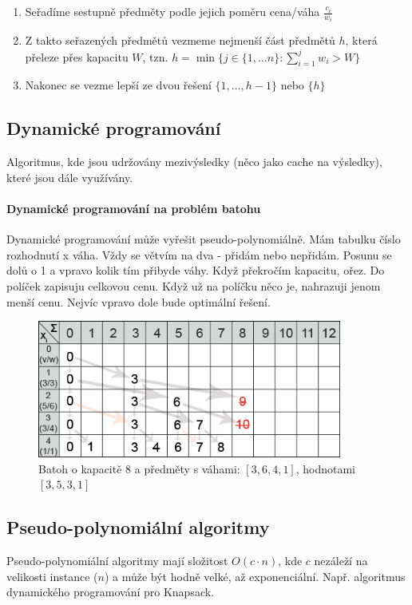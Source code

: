 \begin{enumerate}
\item Seřadíme sestupně předměty podle jejich poměru cena/váha $\frac{c_i}{w_i}$
\item Z takto seřazených předmětů vezmeme nejmenší část předmětů $h$, která přeleze přes kapacitu $W$, tzn. $h = \min\{j \in \{1,\hdots n\} : \sum\limits^{j}_{i = 1} w_i > W\}$
\item Nakonec se vezme lepší ze dvou řešení $\{1,\hdots, h-1\}$ nebo $\{h\}$
\end{enumerate}

\subsection{Dynamické programování}
Algoritmus, kde jsou udržovány mezivýsledky (něco jako cache na výsledky), které jsou dále využívány.

\paragraph{Dynamické programování na problém batohu}
Dynamické programování může vyřešit pseudo-polynomiálně. Mám tabulku číslo rozhodnutí x váha. Vždy se větvím na dva - přidám nebo nepřidám. Posunu se dolů o 1 a vpravo kolik tím přibyde váhy. Když překročím kapacitu, ořez. Do políček zapisuju celkovou cenu. Když už na políčku něco je, nahrazuji jenom menší cenu. Nejvíc vpravo dole bude optimální řešení.

\begin{figure}[h]
    \begin{center}
        \includegraphics[width=100mm]{09/images/knapsack}
    \end{center}
    \caption{Batoh o kapacitě 8 a předměty s váhami: $[3,6,4,1]$, hodnotami $[3, 5, 3, 1]$}
\end{figure}

\subsection{Pseudo-polynomiální algoritmy}
Pseudo-polynomiální algoritmy mají složitost $O(c \cdot n)$, kde $c$ nezáleží na velikosti instance ($n$) a může být hodně velké, až exponenciální. Např. algoritmus dynamického programování pro Knapsack.
